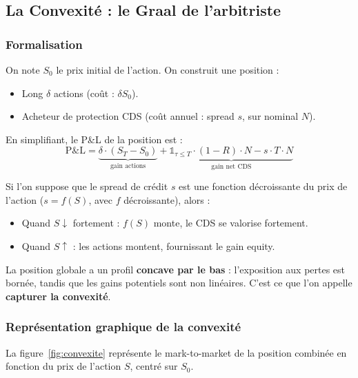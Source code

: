 \subsection{La Convexité : le Graal de l'arbitriste}

\subsubsection{Formalisation}

On note $S_0$ le prix initial de l'action. On construit une position :
\begin{itemize}
    \item Long $\delta$ actions (coût : $\delta S_0$).
    \item Acheteur de protection CDS (coût annuel : spread $s$, sur nominal $N$).
\end{itemize}

En simplifiant, le P\&L de la position est :
\[
\text{P\&L} = \underbrace{\delta \cdot (S_T - S_0)}_{\text{gain actions}} + \underbrace{\mathbb{1}_{\tau \le T} \cdot (1-R) \cdot N - s \cdot T \cdot N}_{\text{gain net CDS}}
\]

Si l'on suppose que le spread de crédit $s$ est une fonction décroissante du prix de l'action ($s = f(S)$, avec $f$ décroissante), alors :
\begin{itemize}
    \item Quand $S \downarrow$ fortement : $f(S)$ monte, le CDS se valorise fortement.
    \item Quand $S \uparrow$ : les actions montent, fournissant le gain equity.
\end{itemize}

La position globale a un profil \textbf{concave par le bas} : l'exposition aux pertes est bornée, tandis que les gains potentiels sont non linéaires. C'est ce que l'on appelle \textbf{capturer la convexité}.

\subsubsection{Représentation graphique de la convexité}

La figure~\ref{fig:convexite} représente le mark-to-market de la position combinée en fonction du prix de l'action $S$, centré sur $S_0$.

